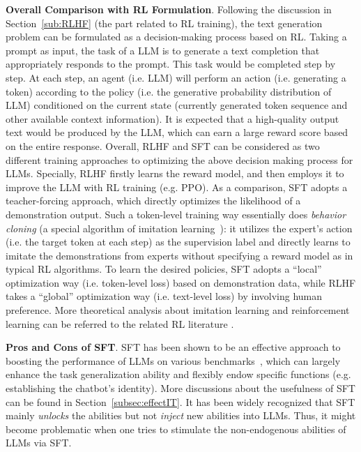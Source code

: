 \textbf{Overall Comparison with RL Formulation}. Following the discussion in Section~\ref{sub:RLHF} (the part related to RL training),  the text generation problem can be formulated as a decision-making process based on RL. Taking a prompt as input, the task of a LLM is to generate a text completion that appropriately responds to the prompt. This task would be completed step by step. At each step, an  agent (i.e. LLM) will perform an action (i.e. generating a token) according to the policy (i.e. the generative probability distribution of LLM) conditioned on the current state (currently generated token sequence and other available  context information). It is expected that a high-quality output text would be produced by the LLM, which can earn a large reward score based on the entire response. Overall, RLHF and SFT can be considered as two different training approaches to optimizing  the  above decision making process for LLMs. Specially, RLHF firstly learns the reward model, and then employs it to improve the LLM with RL training (e.g. PPO). As a comparison, SFT adopts  a teacher-forcing approach, which directly optimizes the likelihood of  a demonstration output. Such a token-level training way essentially does  \emph{behavior cloning} (a special algorithm of imitation learning~\cite{Ahmed-ACM-2017-Imitation}): it utilizes the expert's action (i.e. the target token at each step) as the supervision label and directly learns to imitate the demonstrations from experts without specifying a reward model as in typical RL algorithms. To learn the desired policies, SFT adopts a ``local'' optimization way (i.e. token-level loss) based on demonstration data, while RLHF takes a  ``global'' optimization way (i.e. text-level loss) by involving human preference. More theoretical analysis about  imitation learning and reinforcement learning can be referred to the related RL literature \cite{Ahmed-ACM-2017-Imitation,Levine-youtube-2022-Imitate}.  

\textbf{Pros and Cons of SFT}. SFT has been shown to be an effective approach to  boosting the performance of LLMs on various  benchmarks~\cite{Wei-ICLR-2022-Finetuned,Chung-arxiv-2022-Scaling,alpaca,vicuna2023}, which can largely enhance the task generalization ability  and  flexibly endow specific functions (e.g. establishing the chatbot's identity). More discussions about the usefulness of SFT can be found in Section~\ref{subsec:effectIT}.  
It has been  widely recognized  that SFT mainly \emph{unlocks} the abilities but not \emph{inject} new abilities into LLMs. Thus, it might become problematic when one tries to stimulate the non-endogenous abilities of LLMs via SFT.  


